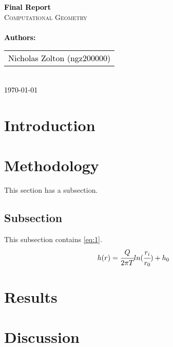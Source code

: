\documentclass{article}
\begin{document}
\begin{titlepage}
    \selectfont 
    \vspace*{3cm}
    
    \centering
    {\Huge \textbf{\textcolor{black}{Final Report}}}\\[1.5cm]
    \textsc{\LARGE Computational Geometry}\\[0.5cm]
    \\[2cm]
    
    {\Large \textbf{\textcolor{black}{Authors:}}}\\[0.5cm]
    \begin{tabular}{c}
        \Large \textcolor{black}{Nicholas Zolton (ngz200000)} \\
    \end{tabular}\\[2cm]
    
    {\Large \textcolor{black}{\today}}
    
    \vfill
\end{titlepage}

\tableofcontents
\newpage

\section*{Introduction}

\section{Methodology}
This section has a subsection.
\subsection{Subsection}
This subsection contains \autoref{eq:1}.
\begin{equation}
\label{eq:1}
    h(r) = \cfrac{Q}{2\pi T} ln(\cfrac{r_i}{r_0})+h_0
\end{equation}

\section{Results}

\section{Discussion}
\newpage



\end{document}
